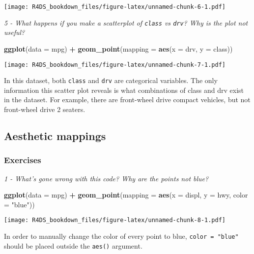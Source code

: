 \documentclass[]{article}
\newenvironment{Shaded}{\begin{snugshade}}{\end{snugshade}}
\newcommand{\KeywordTok}[1]{\textcolor[rgb]{0.13,0.29,0.53}{\textbf{#1}}}
\newcommand{\DataTypeTok}[1]{\textcolor[rgb]{0.13,0.29,0.53}{#1}}
\newcommand{\StringTok}[1]{\textcolor[rgb]{0.31,0.60,0.02}{#1}}
\newcommand{\OperatorTok}[1]{\textcolor[rgb]{0.81,0.36,0.00}{\textbf{#1}}}
\newcommand{\NormalTok}[1]{#1}
\theoremstyle{definition}
\theoremstyle{definition}
\theoremstyle{definition}
\theoremstyle{remark}
\begin{document}
\texttt{[image: R4DS\_bookdown\_files/figure-latex/unnamed-chunk-6-1.pdf]}

\emph{5 - What happens if you make a scatterplot of \texttt{class} vs
\texttt{drv}? Why is the plot not useful?}

\begin{Shaded}
\begin{Highlighting}[]
\KeywordTok{ggplot}\NormalTok{(}\DataTypeTok{data =}\NormalTok{ mpg) }\OperatorTok{+}
\StringTok{  }\KeywordTok{geom_point}\NormalTok{(}\DataTypeTok{mapping =} \KeywordTok{aes}\NormalTok{(}\DataTypeTok{x =}\NormalTok{ drv, }\DataTypeTok{y =}\NormalTok{ class))}
\end{Highlighting}
\end{Shaded}

\texttt{[image: R4DS\_bookdown\_files/figure-latex/unnamed-chunk-7-1.pdf]}

In this dataset, both \texttt{class} and \texttt{drv} are categorical
variables. The only information this scatter plot reveals is what
combinations of class and drv exist in the dataset. For example, there
are front-wheel drive compact vehicles, but not front-wheel drive 2
seaters.

\subsection{Aesthetic mappings}\label{aesthetic-mappings}

\subsubsection{Exercises}\label{exercises-1}

\emph{1 - What's gone wrong with this code? Why are the points not
blue?}

\begin{Shaded}
\begin{Highlighting}[]
\KeywordTok{ggplot}\NormalTok{(}\DataTypeTok{data =}\NormalTok{ mpg) }\OperatorTok{+}\StringTok{ }
\StringTok{  }\KeywordTok{geom_point}\NormalTok{(}\DataTypeTok{mapping =} \KeywordTok{aes}\NormalTok{(}\DataTypeTok{x =}\NormalTok{ displ, }\DataTypeTok{y =}\NormalTok{ hwy, }\DataTypeTok{color =} \StringTok{"blue"}\NormalTok{))}
\end{Highlighting}
\end{Shaded}

\texttt{[image: R4DS\_bookdown\_files/figure-latex/unnamed-chunk-8-1.pdf]}

In order to manually change the color of every point to blue,
\texttt{color\ =\ "blue"} should be placed outside the \texttt{aes()}
argument.
\end{document}
